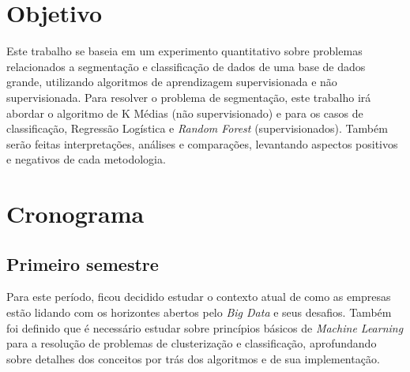 

\section{Objetivo}

Este trabalho se baseia em um experimento quantitativo sobre problemas relacionados a segmentação e classificação de dados de uma base de dados grande, utilizando algoritmos de aprendizagem supervisionada e não supervisionada. Para resolver o problema de segmentação, este trabalho irá abordar o algoritmo de K Médias (não supervisionado) e para os casos de classificação, Regressão Logística e \emph{Random Forest} (supervisionados). Também serão feitas interpretações, análises e comparações, levantando aspectos positivos e negativos de cada metodologia.

\section{Cronograma}

\subsection{Primeiro semestre}

Para este período, ficou decidido estudar o contexto atual de como as empresas estão lidando com os horizontes abertos pelo \emph{Big Data} e seus desafios. Também foi definido que é necessário estudar sobre princípios básicos de \emph{Machine Learning} para a resolução de problemas de clusterização e classificação, aprofundando sobre detalhes dos conceitos por trás dos algoritmos e de sua implementação.


